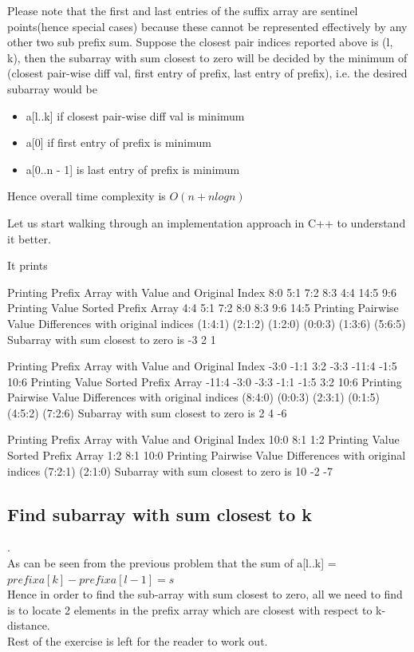 Please note that the first and last entries of the suffix array are sentinel points(hence special cases) because these cannot be represented effectively by any other two sub prefix sum. Suppose the closest pair indices reported above is (l, k), then the subarray with sum closest to zero will be decided by the minimum of (closest pair-wise diff val, first entry of prefix, last entry of prefix), i.e. the desired subarray would be 
\begin{itemize}
    \item a[l..k] if closest pair-wise diff val is minimum
    \item a[0] if first entry of prefix is minimum
    \item a[0..n - 1] is last entry of prefix is minimum
\end{itemize} 

Hence overall time complexity is $O(n + nlogn)$

Let us start walking through an implementation approach in C++ to understand it better.

It prints
\begin{boxedverbatim}
Printing Prefix Array with Value and Original Index
8:0 5:1 7:2 8:3 4:4 14:5 9:6 
Printing Value Sorted Prefix Array
4:4 5:1 7:2 8:0 8:3 9:6 14:5 
Printing Pairwise Value Differences with 
original indices
(1:4:1) (2:1:2) (1:2:0) (0:0:3) (1:3:6) (5:6:5) 
Subarray with sum closest to zero is
-3 2 1 

Printing Prefix Array with Value and Original Index
-3:0 -1:1 3:2 -3:3 -11:4 -1:5 10:6 
Printing Value Sorted Prefix Array
-11:4 -3:0 -3:3 -1:1 -1:5 3:2 10:6 
Printing Pairwise Value Differences with 
original indices
(8:4:0) (0:0:3) (2:3:1) (0:1:5) (4:5:2) (7:2:6) 
Subarray with sum closest to zero is
2 4 -6 

Printing Prefix Array with Value and Original Index
10:0 8:1 1:2 
Printing Value Sorted Prefix Array
1:2 8:1 10:0 
Printing Pairwise Value Differences with 
original indices
(7:2:1) (2:1:0) 
Subarray with sum closest to zero is
10 -2 -7 
\end{boxedverbatim}

\subsection{Find subarray with sum closest to k}
\qquad {}.
\vspace{1mm}\\
As can be seen from the previous problem that the sum of a[l..k] = \\
$prefixa[k] - prefixa[l - 1] = s$\\
Hence in order to find the sub-array with sum closest to zero, all we need to find is to locate 2 elements in the prefix array which are closest with respect to k-distance. \vspace{1mm}\\
Rest of the exercise is left for the reader to work out.

